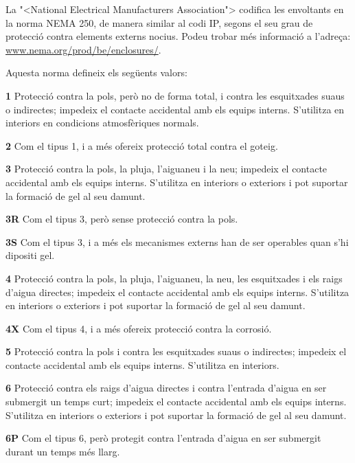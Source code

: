 La {"<}National Electrical Manufacturers Association{">}
codifica les envoltants en la norma \textsf{NEMA 250}, de manera similar al codi \textsf{IP}, segons el seu grau de protecci\'{o} contra elements externs nocius. Podeu trobar m\'{e}s informaci\'{o} a l'adre\c{c}a: \href{http://www.nema.org/prod/be/enclosures/}{www.nema.org/prod/be/enclosures/}.

Aquesta norma defineix els seg\"{u}ents valors:

\begin{list}{}
   {\setlength{\labelwidth}{10mm} \setlength{\leftmargin}{10mm} \setlength{\labelsep}{2mm}}
   \item[\textbf{1}] Protecci\'{o} contra la pols, per\`{o} no de forma total, i contra les esquitxades suaus o indirectes; impedeix el contacte accidental amb els equips interns. S'utilitza en interiors en condicions atmosf\`{e}riques normals.
   \item[\textbf{2}] Com el tipus 1, i a m\'{e}s ofereix protecci\'{o} total contra el goteig.
   \item[\textbf{3}] Protecci\'{o} contra la pols, la pluja, l'aiguaneu i la neu; impedeix el contacte accidental amb els equips interns. S'utilitza en interiors o exteriors i pot suportar la formaci\'{o} de gel al seu damunt.
   \item[\textbf{3R}] Com el tipus 3, per\`{o} sense protecci\'{o} contra la pols.
   \item[\textbf{3S}] Com el tipus 3, i a m\'{e}s els mecanismes externs han de ser operables quan s'hi dipositi gel.
    \item[\textbf{4}] Protecci\'{o} contra la pols, la pluja, l'aiguaneu, la neu, les esquitxades i els raigs d'aigua directes; impedeix el contacte accidental amb els equips interns. S'utilitza en interiors o exteriors i pot suportar la formaci\'{o} de gel al seu damunt.
   \item[\textbf{4X}] Com el tipus 4, i a m\'{e}s ofereix protecci\'{o} contra la corrosi\'{o}.
   \item[\textbf{5}] Protecci\'{o} contra la pols i contra les esquitxades suaus o indirectes; impedeix el contacte accidental amb els equips interns. S'utilitza en interiors.
   \item[\textbf{6}] Protecci\'{o} contra els raigs d'aigua directes i contra l'entrada d'aigua en ser submergit un temps curt; impedeix el contacte accidental amb els equips interns. S'utilitza en interiors o exteriors i pot suportar la formaci\'{o} de gel al seu damunt.
   \item[\textbf{6P}] Com el tipus 6, per\`{o} protegit contra l'entrada d'aigua en ser submergit durant un temps m\'{e}s llarg.

\end{list}
